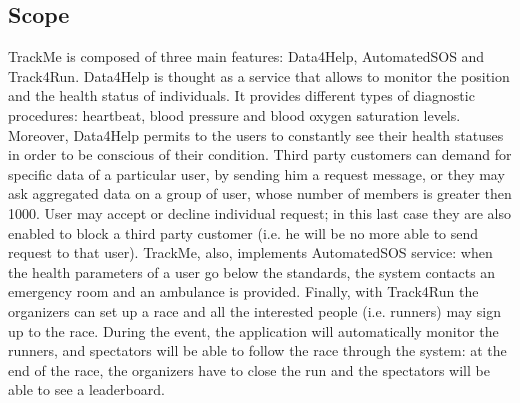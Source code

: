 \subsection{Scope}
TrackMe is composed of three main features: Data4Help, AutomatedSOS and Track4Run.
Data4Help is thought as a service that allows to monitor the position and the health status of individuals. 
It provides different types of diagnostic procedures: heartbeat, blood pressure and blood oxygen saturation levels. 
Moreover, Data4Help permits to the users to constantly see their health statuses in order to be conscious of their condition. 
Third party customers can demand for specific data of a particular user, by sending him a request message, or they may ask aggregated data
on a group of user, whose number of members is greater then 1000. User may accept or decline individual request; in this last case they are
also enabled to block a third party customer (i.e. he will be no more able to send request to that user).
TrackMe, also, implements AutomatedSOS service: when the health parameters of a user go below the standards, the system contacts an emergency
room and an ambulance is provided. 
Finally, with Track4Run the organizers can set up a race and all the interested people (i.e. runners) may sign up to the race. 
During the event, the application will automatically monitor the runners, and spectators will be able to follow the race through the system: 
at the end of the race, the organizers have to close the run and the spectators will be able to see a leaderboard. 